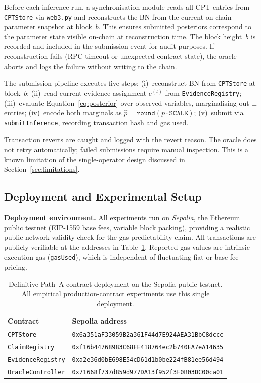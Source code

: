 \documentclass[journal]{IEEEtran}
\theoremstyle{definition}
\theoremstyle{remark}
\begin{document}
Before each inference run, a synchronisation module
reads all CPT entries from \texttt{CPTStore} via
\texttt{web3.py} and reconstructs the BN from the
current on-chain parameter snapshot at block~$b$.
This ensures submitted posteriors correspond to the
parameter state visible on-chain at reconstruction
time. The block height~$b$ is recorded and included
in the submission event for audit purposes. If
reconstruction fails (RPC timeout or unexpected
contract state), the oracle aborts and logs the
failure without writing to the chain.

The submission pipeline executes five steps:
(i)~reconstruct BN from \texttt{CPTStore} at block~$b$;
(ii)~read current evidence assignment $e^{(t)}$ from
\texttt{EvidenceRegistry};
(iii)~evaluate Equation~\eqref{eq:posterior} over
observed variables, marginalising out $\bot$ entries;
(iv)~encode both marginals as
$\widehat{p}=\texttt{round}(p\cdot\texttt{SCALE})$;
(v)~submit via \texttt{submitInference}, recording
transaction hash and gas used.

Transaction reverts are caught and logged with the
revert reason. The oracle does not retry automatically;
failed submissions require manual inspection. This is
a known limitation of the single-operator design
discussed in Section~\ref{sec:limitations}.

\subsection{Deployment and Experimental Setup}

\textbf{Deployment environment.}
All experiments run on \emph{Sepolia}, the Ethereum
public testnet (EIP-1559 base fees, variable block
packing), providing a realistic public-network validity
check for the gas-predictability claim. All transactions
are publicly verifiable at the addresses in
Table~\ref{tab:contracts}. Reported gas values are
intrinsic execution gas (\texttt{gasUsed}), which is
independent of fluctuating fiat or base-fee pricing.

\begin{table}[t]
\centering
\caption{Definitive Path~A contract deployment on the
Sepolia public testnet. All empirical production-contract
experiments use this single deployment.}
\label{tab:contracts}
\setlength{\tabcolsep}{3pt}
\begin{tabularx}{\columnwidth}{l>{\raggedright\arraybackslash}X}
\toprule
\textbf{Contract} & \textbf{Sepolia address} \\
\midrule
\texttt{CPTStore}
  & {\tiny\texttt{0x6a351aF33059B2a361F44d7E924AEA31BbC8dccc}} \\
\texttt{ClaimRegistry}
  & {\tiny\texttt{0xf16b44768983C68FE418764ec2b740EA7eA14635}} \\
\texttt{EvidenceRegistry}
  & {\tiny\texttt{0xa2e36d0bE698E54cD61d1b0be224fB81ee56d494}} \\
\texttt{OracleController}
  & {\tiny\texttt{0x71668f737d859d977DA13f952f3F0B03DC00ca01}} \\
\bottomrule
\end{tabularx}
\end{table}
\end{document}
